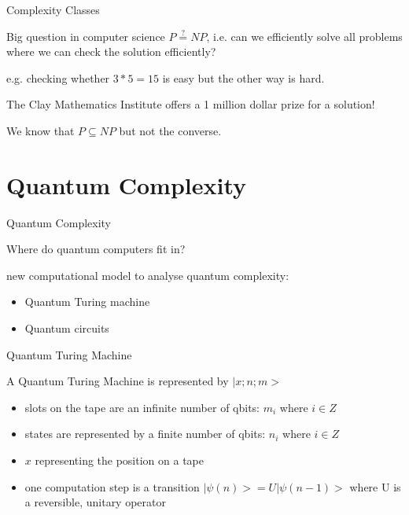 \documentclass[c]{beamer}
\begin{document}
\begin{frame}{Complexity Classes}
 
 \begin{block}{Big question in computer science}
 	$P\stackrel{?}{=}NP$, i.e. can we efficiently solve all problems where we can check the solution efficiently?
 \end{block}
 e.g. checking whether $3*5 = 15$ is easy but the other way is hard.

 \medskip
 The Clay Mathematics Institute offers a 1 million dollar prize for a solution!
 
 We know that $ P \subseteq NP$ but not the converse. 
\end{frame}

\section{Quantum Complexity}

\begin{frame}{Quantum Complexity}

Where do quantum computers fit in?

new computational model to analyse quantum complexity:
\begin{itemize}
\item Quantum Turing machine
\item Quantum circuits
\end{itemize}

\end{frame}

\begin{frame}{Quantum Turing Machine}

A Quantum Turing Machine is represented by $|x;n;m>$
\begin{itemize}
\item slots on the tape are an infinite number of qbits: $m_i$ where $i \in Z$ 
\item states are represented by a finite number of qbits: $n_i$ where $i \in Z$
\item $x$ representing the position on a tape
\item one computation step is a transition $|\psi(n)> = U|\psi(n-1)>$ where
U is a reversible, unitary operator

\end{itemize}

\end{frame}
\end{document}
